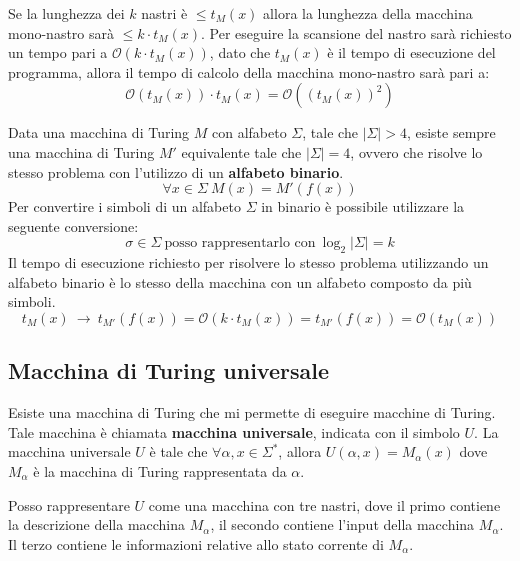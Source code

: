 \begin{dimostrazione}
    Se la lunghezza dei $k$ nastri è $\leq t_M(x)$ allora la lunghezza della macchina
    mono-nastro sarà $\leq k \cdot t_M(x)$. Per eseguire la scansione del nastro sarà
    richiesto un tempo pari a $\mathcal{O}(k \cdot t_M(x))$, dato che $t_M(x)$ è il
    tempo di esecuzione del programma, allora il tempo di calcolo della macchina
    mono-nastro sarà pari a:
    \begin{equation}
        \mathcal{O}(t_M(x)) \cdot t_M(x) = \mathcal{O}((t_M(x))^2)
    \end{equation}
\end{dimostrazione}
Data una macchina di Turing $M$ con alfabeto $\Sigma$, tale che $|\Sigma| > 4$,
esiste sempre una macchina di Turing $M'$ equivalente tale che $|\Sigma| = 4$, ovvero
che risolve lo stesso problema con l'utilizzo di un \textbf{alfabeto binario}.
\begin{equation}
    \forall x \in \Sigma \ M(x) = M'(f(x))
\end{equation}
Per convertire i simboli di un alfabeto $\Sigma$ in binario è possibile utilizzare
la seguente conversione:
\begin{equation}
    \sigma \in \Sigma \ \text{posso rappresentarlo con} \ \log_{2}|\Sigma | = k
\end{equation}
Il tempo di esecuzione richiesto per risolvere lo stesso problema utilizzando un
alfabeto binario è lo stesso della macchina con un alfabeto composto da più simboli.
\begin{equation}
    t_M(x) \ \to \ t_{M'}(f(x)) = \mathcal{O}(k \cdot t_M(x)) = t_{M'}(f(x)) = \mathcal{O}(t_M(x))
\end{equation}
\subsection{Macchina di Turing universale}
Esiste una macchina di Turing che mi permette di eseguire macchine di Turing. Tale macchina
è chiamata \textbf{macchina universale}, indicata con il simbolo $U$. La macchina
universale $U$ è tale che $\forall \alpha, x \in \Sigma^{\ast}$, allora
$U(\alpha, x) = M_{\alpha}(x)$ dove $M_{\alpha}$ è la macchina di Turing rappresentata da $\alpha$.

Posso rappresentare $U$ come una macchina con tre nastri, dove il primo contiene
la descrizione della macchina $M_{\alpha}$, il secondo contiene l'input della macchina
$M_{\alpha}$. Il terzo contiene le informazioni relative allo stato corrente di $M_{\alpha}$.

